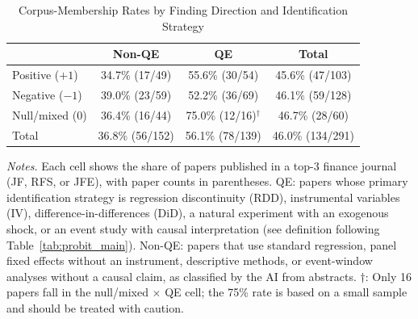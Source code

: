 \documentclass[12pt]{article}
\begin{document}
\begin{table}[H]
\centering
\caption{Corpus-Membership Rates by Finding Direction and Identification Strategy}
\label{tab:quasiexp_direction}
\begin{singlespace}
\small
\begin{tabular}{lccc}
\hline\hline
 & Non-QE & QE & Total \\
\hline
Positive ($+1$) & 34.7\% (17/49) & 55.6\% (30/54) & 45.6\% (47/103) \\
Negative ($-1$) & 39.0\% (23/59) & 52.2\% (36/69) & 46.1\% (59/128) \\
Null/mixed ($0$) & 36.4\% (16/44) & 75.0\% (12/16)$^{\dagger}$ & 46.7\% (28/60) \\
\hline
Total & 36.8\% (56/152) & 56.1\% (78/139) & 46.0\% (134/291) \\
\hline\hline
\end{tabular}
\begin{minipage}{\textwidth}
\smallskip
\footnotesize
\textit{Notes.} Each cell shows the share of papers published in a top-3
finance journal (JF, RFS, or JFE), with paper counts in parentheses.
QE: papers whose primary identification strategy is regression
discontinuity (RDD), instrumental variables (IV),
difference-in-differences (DiD), a natural experiment with an exogenous
shock, or an event study with causal interpretation (see definition
following Table~\ref{tab:probit_main}).  Non-QE: papers that use
standard regression, panel fixed effects without an instrument,
descriptive methods, or event-window analyses without a causal claim,
as classified by the AI from abstracts.  $\dagger$: Only 16
papers fall in the null/mixed $\times$ QE cell; the 75\% rate is based on
a small sample and should be treated with caution.
\end{minipage}
\end{singlespace}
\end{table}
\end{document}
